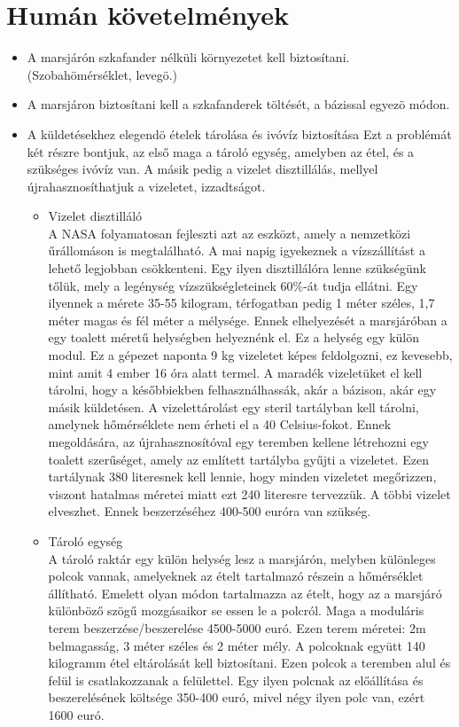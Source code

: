 \documentclass[12pt]{report}
\begin{document}
\section{Humán követelmények}
\begin{itemize}
  \item {} A marsjárón szkafander nélküli környezetet kell biztosítani. (Szobahömérséklet, levegö.)
  \item {} A marsjáron biztosítani kell a szkafanderek töltését, a bázissal egyezö módon.
  \item {} A küldetésekhez elegendö ételek tárolása és ivóvíz biztosítása
  Ezt a problémát két részre bontjuk, az első maga a tároló egység, amelyben az étel, és a szükséges ivóvíz van.  A másik pedig a vizelet disztillálás, mellyel újrahasznosíthatjuk a vizeletet, izzadtságot. 
  \begin{itemize}
    \item Vizelet disztilláló  \\ 
    A NASA folyamatosan fejleszti azt az eszközt, amely a nemzetközi űrállomáson is megtalálható. A mai napig igyekeznek a vízszállítást a lehető legjobban csökkenteni. Egy ilyen disztillálóra lenne szükségünk tőlük, mely a legénység vízszükségleteinek 60\%-át tudja ellátni.
    Egy ilyennek a mérete 35-55 kilogram, térfogatban pedig 1 méter széles, 1,7 méter magas és fél méter a mélysége.
    Ennek elhelyezését a marsjáróban a egy toalett méretű helységben helyeznénk el. Ez a helység egy külön modul.
    Ez a gépezet naponta 9 kg vizeletet képes feldolgozni, ez kevesebb, mint amit 4 ember 16 óra alatt termel. A maradék vizeletüket el kell tárolni, hogy a későbbiekben felhasználhassák, akár a bázison, akár egy másik küldetésen. A vizelettárolást egy steril tartályban kell tárolni, amelynek hőmérséklete nem érheti el a 40 Celsius-fokot. Ennek megoldására, az újrahasznosítóval egy teremben kellene létrehozni egy toalett szerűséget, amely az említett tartályba gyűjti a vizeletet. Ezen tartálynak 380 literesnek kell lennie, hogy minden vizeletet megőrizzen, viszont hatalmas méretei miatt ezt 240 literesre tervezzük. A többi vizelet elveszhet. Ennek beszerzéséhez 400-500 euróra van szükség.
    \item Tároló egység  \\ 
    A tároló raktár egy külön helység lesz a marsjárón, melyben különleges polcok vannak, amelyeknek az ételt tartalmazó részein a hőmérséklet állítható. Emelett olyan módon tartalmazza az ételt, hogy az a marsjáró különböző szögű mozgásaikor se essen le a polcról. Maga a moduláris terem beszerzése/beszerelése 4500-5000 euró. Ezen terem méretei: 2m belmagasság, 3 méter széles és 2 méter mély. A polcoknak együtt 140 kilogramm étel eltárolását kell biztosítani. Ezen polcok a teremben alul és felül is csatlakozzanak a felülettel. Egy ilyen polcnak az előállítása és beszerelésének költsége 350-400 euró, mivel négy ilyen polc van, ezért 1600 euró. \\

\end{itemize}
\end{itemize}
\end{document}
